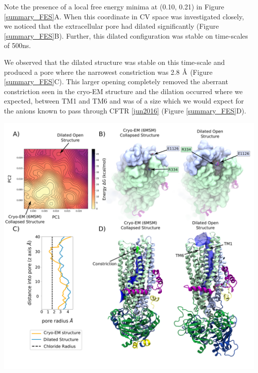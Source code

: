 Note the presence of a local free energy minima at (0.10, 0.21) in Figure \ref{summary_FES}A. When this coordinate in CV space was investigated closely, we noticed that the extracellular pore had dilated significantly (Figure \ref{summary_FES}B). Further, this dilated configuration was stable on time-scales of 500ns. 

We observed that the dilated structure was stable on this time-scale and produced a pore where the narrowest constriction was 2.8 $\textup{\AA}$ (Figure \ref{summary_FES}C). This larger opening completely removed the aberrant constriction seen in the cryo-EM structure and the dilation occurred where we expected, between TM1 and TM6 and was of a size which we would expect for the anions known to pass through CFTR \ref{jun2016} (Figure \ref{summary_FES}D). 

	\begin{center}
		\includegraphics[width=1\textwidth]{figures/opening/summary_dilated_structure_1.pdf}
	\end{center}
	\begingroup
	\captionsetup{singlelinecheck = false, justification=raggedright}
